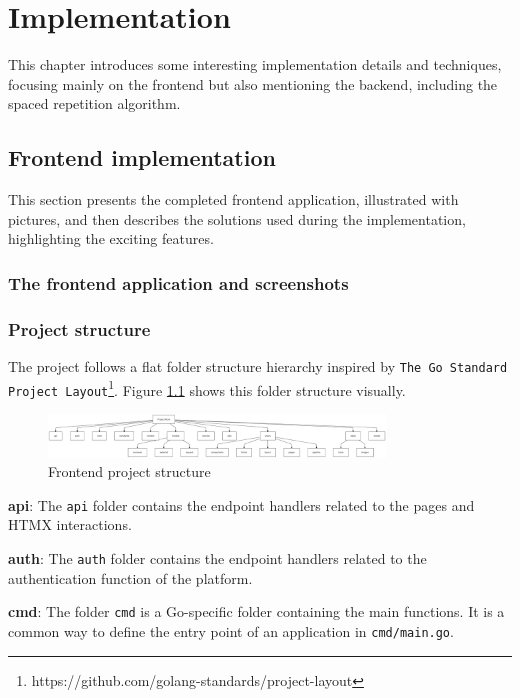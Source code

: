 \chapter{Implementation}

This chapter introduces some interesting implementation details and techniques, focusing mainly on the frontend but also mentioning the backend, including the spaced repetition algorithm.

\section{Frontend implementation}

This section presents the completed frontend application, illustrated with pictures, and then describes the solutions used during the implementation, highlighting the exciting features.

\subsection{The frontend application and screenshots}

\subsection{Project structure}

The project follows a flat folder structure hierarchy inspired by \texttt{The Go Standard Project Layout}\footnote{https://github.com/golang-standards/project-layout}. Figure \ref{fig:frontend-project-structure} shows this folder structure visually.

\begin{figure}[H]
    \centering
    \includegraphics[width=0.8\textwidth, keepaspectratio]{figures/frontend-project-structure.png}
    \caption{Frontend project structure}
    \label{fig:frontend-project-structure}
\end{figure}

\textbf{api}: The \texttt{api} folder contains the endpoint handlers related to the pages and HTMX interactions.

\textbf{auth}: The \texttt{auth} folder contains the endpoint handlers related to the authentication function of the platform.

\textbf{cmd}: The folder \texttt{cmd} is a Go-specific folder containing the main functions. It is a common way to define the entry point of an application in \texttt{cmd/main.go}.

